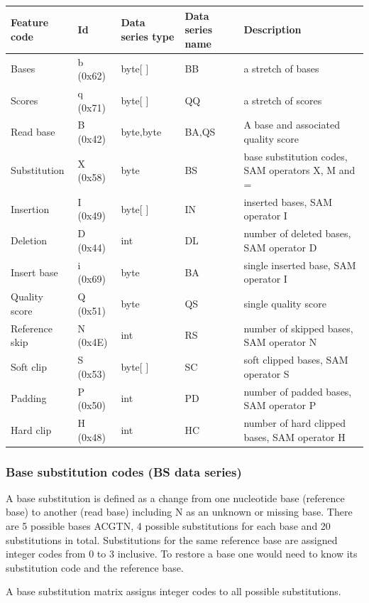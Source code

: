 \documentclass[a4paper]{article}
\begin{document}
\begin{tabular}{|>{\raggedright}p{91pt}|>{\raggedright}p{45pt}|>{\raggedright}p{72pt}|>{\raggedright}p{66pt}|>{\raggedright}p{132pt}|}
\hline
\textbf{Feature code} & \textbf{Id} & \textbf{Data series type} & \textbf{Data 
series name} & \textbf{Description}\tabularnewline
\hline
Bases & b (0x62) & byte[ ] & BB & a stretch of bases\tabularnewline
\hline
Scores & q (0x71) & byte[ ] & QQ & a stretch of scores\tabularnewline
\hline
%
Read base & B (0x42) & byte,byte & BA,QS & A base and associated quality score\tabularnewline
\hline
Substitution & X (0x58) & byte & BS & base substitution codes, SAM operators X, 
M and =\tabularnewline
\hline
Insertion & I (0x49) & byte[ ] & IN & inserted bases, SAM operator I\tabularnewline
\hline
Deletion & D (0x44) & int & DL & number of deleted bases, SAM operator D\tabularnewline
\hline
Insert base & i (0x69) & byte & BA & single inserted base, SAM operator I\tabularnewline
\hline
Quality score & Q (0x51) & byte & QS & single quality score\tabularnewline
\hline
Reference skip & N (0x4E) & int & RS & number of skipped bases, SAM operator N\tabularnewline
\hline
Soft clip & S (0x53) & byte[ ] & SC & soft clipped bases, SAM operator S\tabularnewline
\hline
Padding & P (0x50) & int & PD & number of padded bases, SAM operator P\tabularnewline
\hline
Hard clip & H (0x48) & int & HC & number of hard clipped bases, SAM operator H\tabularnewline
\hline
\end{tabular}

\subsubsection*{Base substitution codes (BS data series)}

A base substitution is defined as a change from one nucleotide base (reference 
base) to another (read base) including N as an unknown or missing base. There are 
5 possible bases ACGTN, 4 possible substitutions for each base and 20 substitutions 
in total. Substitutions for the same reference base are assigned integer codes 
from 0 to 3 inclusive. To restore a base one would need to know its substitution 
code and the reference base. 

A base substitution matrix assigns integer codes to all possible substitutions. 
\end{document}
